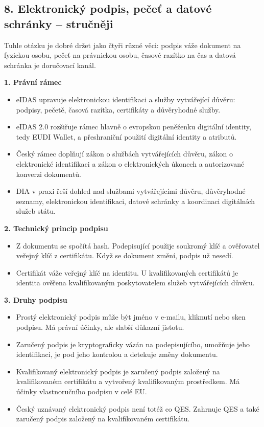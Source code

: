 
\subsection*{8. Elektronický podpis, pečeť a datové schránky -- stručněji}
Tuhle otázku je dobré držet jako čtyři různé věci: podpis váže dokument na fyzickou osobu, pečeť na právnickou osobu, časové razítko na čas a datová schránka je doručovací kanál.

\textbf{1. Právní rámec}
\begin{itemize}
  \item eIDAS upravuje elektronickou identifikaci a služby vytvářející důvěru: podpisy, pečetě, časová razítka, certifikáty a důvěryhodné služby.
  \item eIDAS 2.0 rozšiřuje rámec hlavně o evropskou peněženku digitální identity, tedy EUDI Wallet, a přeshraniční použití digitální identity a atributů.
  \item Český rámec doplňují zákon o službách vytvářejících důvěru, zákon o elektronické identifikaci a zákon o elektronických úkonech a autorizované konverzi dokumentů.
  \item DIA v praxi řeší dohled nad službami vytvářejícími důvěru, důvěryhodné seznamy, elektronickou identifikaci, datové schránky a koordinaci digitálních služeb státu.
\end{itemize}

\textbf{2. Technický princip podpisu}
\begin{itemize}
  \item Z dokumentu se spočítá hash. Podepisující použije soukromý klíč a ověřovatel veřejný klíč z certifikátu. Když se dokument změní, podpis už nesedí.
  \item Certifikát váže veřejný klíč na identitu. U kvalifikovaných certifikátů je identita ověřena kvalifikovaným poskytovatelem služeb vytvářejících důvěru.
\end{itemize}

\textbf{3. Druhy podpisu}
\begin{itemize}
  \item Prostý elektronický podpis může být jméno v e-mailu, kliknutí nebo sken podpisu. Má právní účinky, ale slabší důkazní jistotu.
  \item Zaručený podpis je kryptograficky vázán na podepisujícího, umožňuje jeho identifikaci, je pod jeho kontrolou a detekuje změny dokumentu.
  \item Kvalifikovaný elektronický podpis je zaručený podpis založený na kvalifikovaném certifikátu a vytvořený kvalifikovaným prostředkem. Má účinky vlastnoručního podpisu v celé EU.
  \item Český uznávaný elektronický podpis není totéž co QES. Zahrnuje QES a také zaručený podpis založený na kvalifikovaném certifikátu.
\end{itemize}

